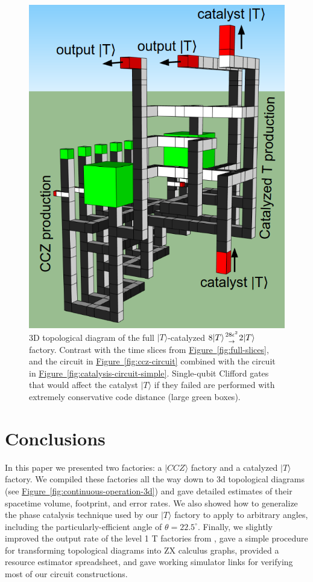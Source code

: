 \documentclass[superscriptaddress,notitlepage,longbibliography]{revtex4-1}
\newcommand{\fig}[1]{\hyperref[fig:#1]{Figure~\ref*{fig:#1}}}
\newcommand{\factory}[3]{$#1 \genfrac{}{}{0pt}{}{#2}{\rightarrow} {#3}$ factory}
\begin{document}
\begin{figure}[ht]
  \label{fig:full-3d}
    \includegraphics[width=\textwidth,height=\dimexpr\textheight-6\baselineskip,keepaspectratio]{full-3d.png}
  \caption{
    3D topological diagram of the full $|T\rangle$-catalyzed \factory{8|T\rangle}{28\epsilon^2}{2|T\rangle}.
    Contrast with the time slices from \fig{full-slices}, and the circuit in \fig{ccz-circuit} combined with the circuit in \fig{catalysis-circuit-simple}.
    Single-qubit Clifford gates that would affect the catalyst $|T\rangle$ if they failed are performed with extremely conservative code distance (large green boxes).
  }
\end{figure}


\section{Conclusions}
\label{sec:conclusion}

In this paper we presented two factories: a $|CCZ\rangle$ factory and a catalyzed $|T\rangle$ factory.
We compiled these factories all the way down to 3d topological diagrams (see \fig{continuous-operation-3d}) and gave detailed estimates of their spacetime volume, footprint, and error rates.
We also showed how to generalize the phase catalysis technique used by our $|T\rangle$ factory to apply to arbitrary angles, including the particularly-efficient angle of $\theta=22.5^\circ$.
Finally, we slightly improved the output rate of the level 1 T factories from \cite{fowler2018}, gave a simple procedure for transforming topological diagrams into ZX calculus graphs, provided a resource estimator spreadsheet, and gave working simulator links for verifying most of our circuit constructions.
\end{document}
